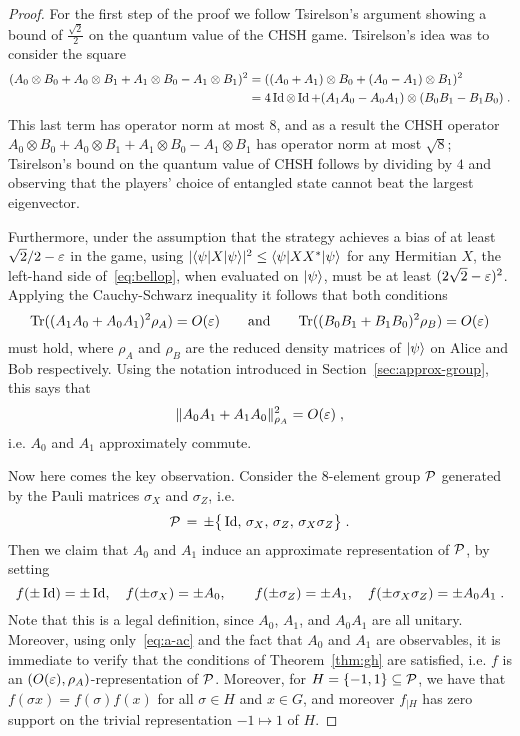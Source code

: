 \begin{proof}
For the first step of the proof we follow Tsirelson's argument showing a bound of $\frac{\sqrt{2}}{2}$ on the quantum value of the CHSH game. Tsirelson's idea was to consider the square
\begin{align}
(A_0\otimes B_0 + A_0\otimes B_1 + A_1\otimes B_0 - A_1\otimes B_1 )^2 &=( (A_0+A_1)\otimes B_0 + (A_0-A_1)\otimes B_1 )^2\label{eq:bellop}\\
&= 4\mathop{\rm Id}\nolimits\otimes \mathop{\rm Id}\nolimits + (A_1A_0-A_0A_1)\otimes (B_0B_1-B_1B_0)\;.\notag
\end{align}
This last term has operator norm at most $8$, and as a result the CHSH operator $A_0\otimes B_0 + A_0\otimes B_1 + A_1\otimes B_0 - A_1\otimes B_1$ has operator norm at most $\sqrt{8}$; Tsirelson's bound on the quantum value of CHSH follows by dividing by $4$ and observing that the players' choice of entangled state cannot beat the largest eigenvector.

Furthermore, under the assumption that the strategy achieves a bias of at least $\sqrt{2}/2-\varepsilon$ in the game, using $|\langle\psi|X|\psi\rangle|^2 \leq \langle\psi|XX^*|\psi\rangle$ for any Hermitian $X$, the left-hand side of~\eqref{eq:bellop}, when evaluated on $|\psi\rangle$, must be at least $(2\sqrt{2}-\varepsilon)^2$. Applying the Cauchy-Schwarz inequality it follows that both conditions
$$\mbox{\rm Tr}((A_1A_0 + A_0A_1)^2\rho_A) = O({\varepsilon})\qquad \text{and}\qquad \mbox{\rm Tr}((B_0B_1+B_1B_0)^2 \rho_B) = O({\varepsilon})$$
must hold, where $\rho_A$ and $\rho_B$ are the reduced density matrices of $|\psi\rangle$ on Alice and Bob respectively. 
Using the notation introduced in Section~\ref{sec:approx-group}, this says that 
\begin{equation}\label{eq:a-ac}
\|A_0A_1 + A_1A_0\|_{\rho_A}^2 = O({\varepsilon})\;,
\end{equation}
 i.e. $A_0$ and $A_1$ approximately commute. 

Now here comes the key observation. Consider the $8$-element group $\mathcal{P}$ generated by the Pauli matrices $\sigma_X$ and $\sigma_Z$, i.e. 
$$\mathcal{P}\,=\,\pm\big\{ \mathop{\rm Id}\nolimits,\, \sigma_X,\,\sigma_Z,\, \sigma_X\sigma_Z\big\}\;.$$
Then we claim that $A_0$ and $A_1$ induce an approximate representation of $\mathcal{P}$, by setting 
$$ f(\pm \mathop{\rm Id}\nolimits)=\pm\mathop{\rm Id}\nolimits,\quad f(\pm\sigma_X)=\pm A_0,\quad\quad f(\pm\sigma_Z)=\pm A_1,\quad f(\pm\sigma_X\sigma_Z) = \pm A_0A_1\;.$$
Note that this is a legal definition, since $A_0$, $A_1$, and $A_0A_1$ are all unitary. Moreover, using only~\eqref{eq:a-ac} and the fact that $A_0$ and $A_1$ are observables, it is immediate to verify that the conditions of Theorem~\ref{thm:gh} are satisfied, i.e. $f$ is an $(O({\varepsilon}),\rho_A)$-representation of $\mathcal{P}$. Moreover, for $H=\{-1,1\}\subseteq \mathcal{P}$, we have that $f(\sigma x)=f(\sigma)f(x)$ for all $\sigma\in H$ and $x\in G$, and moreover $f_{|H}$ has zero support on the trivial representation $-1\mapsto 1$ of $H$. 


\end{proof}
